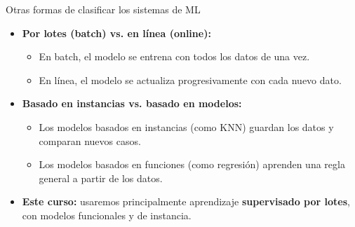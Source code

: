 \documentclass{beamer}
\begin{document}
\begin{frame}{Otras formas de clasificar los sistemas de ML}
	\begin{itemize}
		\item \textbf{Por lotes (batch) vs. en línea (online):}
		\begin{itemize}
			\item En batch, el modelo se entrena con todos los datos de una vez.
			\item En línea, el modelo se actualiza progresivamente con cada nuevo dato.
		\end{itemize}
		
		\item \textbf{Basado en instancias vs. basado en modelos:}
		\begin{itemize}
			\item Los modelos basados en instancias (como KNN) guardan los datos y comparan nuevos casos.
			\item Los modelos basados en funciones (como regresión) aprenden una regla general a partir de los datos.
		\end{itemize}
		
		\item \textbf{Este curso:} usaremos principalmente aprendizaje \textbf{supervisado por lotes}, con modelos funcionales y de instancia.
	\end{itemize}
\end{frame}
\end{document}

